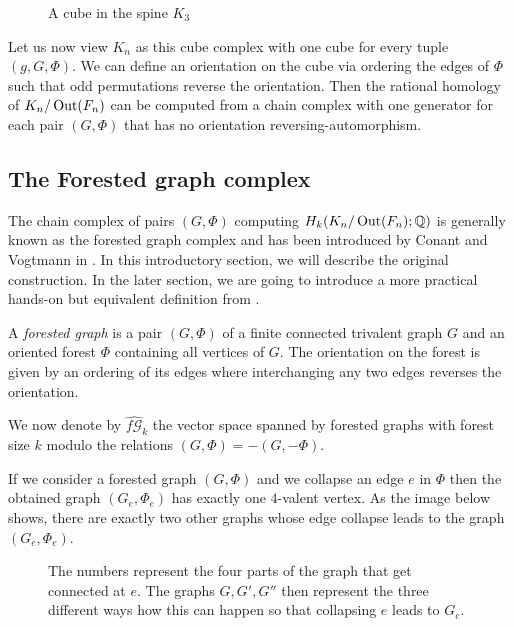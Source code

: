 \begin{figure}[htbp]
	\centering
	\caption{A cube in the spine $K_{3}$}
	\label{fig:spineCube}
\end{figure}
Let us now view $K_{n}$ as this cube complex with one cube for every tuple $(g,G,\Phi)$. 
We can define an orientation on the cube via ordering the edges of $\Phi$ such that odd permutations reverse the orientation. 
Then the rational homology of $K_{n} / \operatorname{Out}(F_{n})$ can be computed from a chain complex with one generator for each pair $(G,\Phi)$ that has no orientation
reversing-automorphism.

\subsection{The Forested graph complex}

The chain complex of pairs $(G,\Phi)$ computing $H_{k}(K_{n} / \operatorname{Out}(F_{n});\mathbb{Q})$ is generally known as the forested graph complex and has been
introduced by Conant and Vogtmann in \cite{conant03}. In this introductory section,
we will describe the original construction. In the later section, we are going to
introduce a more practical hands-on but equivalent definition from \cite{conant08}.

\begin{definition}
	A \emph{forested graph} is a pair $(G,\Phi)$ of a finite connected trivalent graph $G$ and an oriented forest $\Phi$ containing all vertices of $G$.
	The orientation on the forest is given by an ordering of its edges where interchanging any two edges reverses the orientation.
\end{definition}

We now denote by $\widehat{f\mathcal{G}}_{k}$ the vector space spanned by forested graphs with forest size $k$ modulo the relations
$(G,\Phi) = -(G,-\Phi)$.

If we consider a forested graph $(G,\Phi)$ and we collapse an edge $e$ in $\Phi$ then the obtained graph $(G_{e},\Phi_{e})$ 
has exactly one $4$-valent vertex. As the image below shows, there are exactly two other graphs
whose edge collapse leads to the graph $(G_{e},\Phi_{e})$.

\begin{figure}[bhtp]
	\centering
	\captionsetup{width=0.8\textwidth}
	\caption{The numbers represent the four parts of the graph that get connected at $e$.
		The graphs $G,G',G''$ then represent the three different ways how this can happen so that
	collapsing $e$ leads to $G_{e}$.}
\end{figure}


